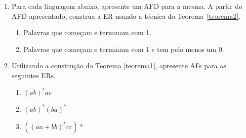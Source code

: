 \documentclass[a4paper]{article}
\theoremstyle{definition}
\begin{document}
  \begin{enumerate}
     \item Para cada linguagem abaixo, apresente um AFD para a mesma. A partir
       do AFD apresentado, construa a ER usando a técnica do
       Teorema~\ref{teorema2}.
       \begin{enumerate}
         \item Palavras que começam e terminam com 1.
         \item Palavras que começam e terminam com 1 e tem pelo menos um 0.
         \end{enumerate}
      \item Utilizando a construção do Teorema \ref{teorema1}, apresente AFs
        para as seguintes ERs.
        \begin{enumerate}
          \item $(ab)^*ac$
          \item $(ab)^*(ba)^*$
          \item $((aa + bb)^*cc)*$
        \end{enumerate}
   \end{enumerate}
\end{document}

